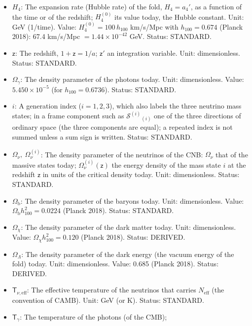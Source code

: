 \documentclass[
  10pt,
]{article}
\providecommand{\tightlist}{%
  \setlength{\itemsep}{0pt}\setlength{\parskip}{0pt}}
\begin{document}
\begin{itemize}
\tightlist
\item
  \(H_4\): The expansion rate (Hubble rate) of the fold, \(H_4 = a_4'\),
  as a function of the time or of the redshift; \(H_4^{(0)}\) its value
  today, the Hubble constant. Unit: GeV (1/time). Value:
  \(H_4^{(0)} = 100\,h_{100}\) km/s/Mpc with \(h_{100} = 0.674\) (Planck
  2018): 67.4 km/s/Mpc \(= 1.44\times10^{-42}\) GeV. Status: STANDARD.
\item
  \(\mathsf{z}\): The redshift, \(1 + \mathsf{z} = 1/a\);
  \(\mathsf{z}'\) an integration variable. Unit: dimensionless. Status:
  STANDARD.
\item
  \(\Omega_\gamma\): The density parameter of the photons today. Unit:
  dimensionless. Value: \(5.450\times10^{-5}\) (for
  \(h_{100} = 0.6736\)). Status: STANDARD.
\item
  \(i\): A generation index (\(i = 1, 2, 3\)), which also labels the
  three neutrino mass states; in a frame component such as
  \(\mathcal{S}^{(i)}{}_{(i)}\) one of the three directions of ordinary
  space (the three components are equal); a repeated index is not summed
  unless a sum sign is written. Status: STANDARD.
\item
  \(\Omega_\nu,\ \Omega_\nu^{(i)}\): The density parameter of the
  neutrinos of the CNB: \(\Omega_\nu\) that of the massive states today;
  \(\Omega_\nu^{(i)}(\mathsf{z})\) the energy density of the mass state
  \(i\) at the redshift \(\mathsf{z}\) in units of the critical density
  today. Unit: dimensionless. Status: STANDARD.
\item
  \(\Omega_{\mathrm{b}}\): The density parameter of the baryons today.
  Unit: dimensionless. Value: \(\Omega_{\mathrm{b}}h_{100}^2 = 0.0224\)
  (Planck 2018). Status: STANDARD.
\item
  \(\Omega_\chi\): The density parameter of the dark matter today. Unit:
  dimensionless. Value: \(\Omega_\chi h_{100}^2 = 0.120\) (Planck 2018).
  Status: DERIVED.
\item
  \(\Omega_\Lambda\): The density parameter of the dark energy (the
  vacuum energy of the fold) today. Unit: dimensionless. Value: 0.685
  (Planck 2018). Status: DERIVED.
\item
  \(\mathsf{T}_{\nu,\mathrm{eff}}\): The effective temperature of the
  neutrinos that carries \(N_{\mathrm{eff}}\) (the convention of CAMB).
  Unit: GeV (or K). Status: STANDARD.
\item
  \(\mathsf{T}_\gamma\): The temperature of the photons (of the CMB);

\end{itemize}
\end{document}

